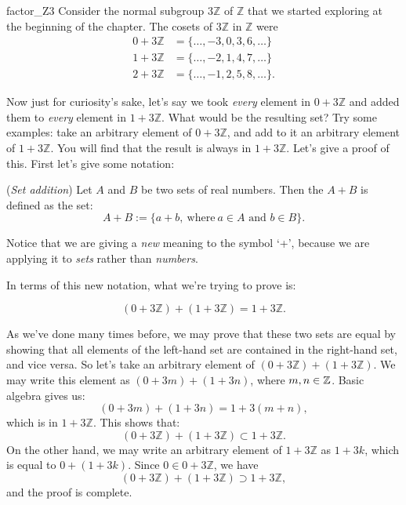 {\begin{example}{factor_Z3}
Consider the normal subgroup $3 {\mathbb Z}$ of ${\mathbb Z}$ that we started exploring at the beginning of the chapter. The cosets of
$3 {\mathbb Z}$ in ${\mathbb Z}$ were
\begin{align*}
0 + 3 {\mathbb Z} & = \{ \ldots, -3, 0, 3, 6, \ldots \} \\
1 + 3 {\mathbb Z} & = \{ \ldots, -2, 1, 4, 7, \ldots \} \\
2 + 3 {\mathbb Z} & = \{ \ldots, -1, 2, 5, 8, \ldots \}.
\end{align*}

Now just for curiosity's sake, let's say we took \emph{every} element in $0 + 3 {\mathbb Z}$ and added them to \emph{every} element in $1 + 3 {\mathbb Z}$.  What would be the resulting set?  Try some examples: take an arbitrary element of $0 + 3 {\mathbb Z}$, and add to it an arbitrary element of $1 + 3 {\mathbb Z}$. You will find that the result is always in $1 + 3 {\mathbb Z}$. Let's give a proof of this. First let's give some notation:

\begin{defn}\label{setplus}(\emph{Set addition})  Let $A$ and $B$ be two sets of real numbers.  Then the  $A + B$ is defined as the set:
\[ A + B := \{a + b, \mathrm{~where~} a \in A \text{ and } b \in B\} .\]
\end{defn}
\noindent
Notice that we are giving a \emph{new} meaning to the symbol `+', because we are applying it to \emph{sets} rather than \emph{numbers}. 

In terms of this new notation, what we're trying to prove is:

\[ (0 + 3 {\mathbb Z}) + (1 + 3 {\mathbb Z}) = 1 + 3 {\mathbb Z}. \]

As we've done many times before, we may prove that these two sets are equal by showing that all elements of the left-hand set are contained in the right-hand set, and vice versa. So let's take an arbitrary element of $(0 + 3 {\mathbb Z}) + (1 + 3 {\mathbb Z})$. We may write this element as $(0 + 3m) + (1 + 3n)$, where $m,n \in \mathbb{Z}$. Basic algebra gives us:
\[(0 + 3m) + (1 + 3 n) = 1 + 3(m+ n), \]
which is in $1 + 3 {\mathbb Z}$. This shows that: 
\[ (0 + 3 {\mathbb Z}) + (1 + 3 {\mathbb Z}) \subset 1 + 3 {\mathbb Z}. \]
On the other hand, we may write an arbitrary element of $1 + 3 {\mathbb Z}$ as $1 + 3k$, which is equal to  $0 + (1 + 3k)$.  Since $0 \in 0 + 3 {\mathbb Z}$, we have 
\[ (0 + 3 {\mathbb Z}) + (1 + 3 {\mathbb Z}) \supset 1 + 3 {\mathbb Z}, \]
and the proof is complete.


\end{example}}
